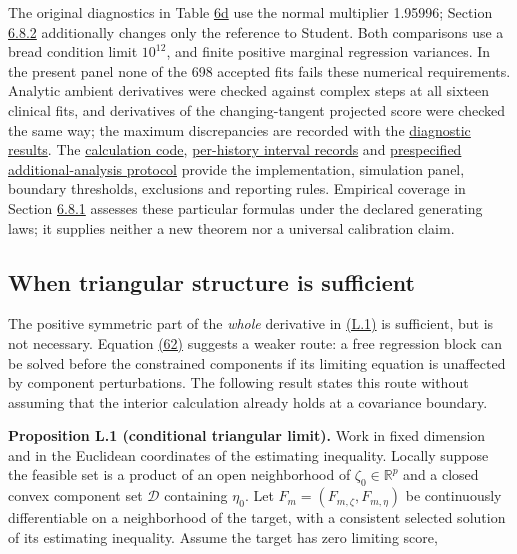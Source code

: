 \documentclass[11pt]{article}
\begin{document}
The original diagnostics in Table \hyperref[tab:6d]{6d} use the normal multiplier 1.95996; Section \hyperref[sec:6.8.2]{6.8.2} additionally changes only the reference to Student. Both comparisons use a bread condition limit \(10^{12}\), and finite positive marginal regression variances. In the present panel none of the 698 accepted fits fails these numerical requirements. Analytic ambient derivatives were checked against complex steps at all sixteen clinical fits, and derivatives of the changing-tangent projected score were checked the same way; the maximum discrepancies are recorded with the \href{../results/manuscript_v010/clinical_records.json}{diagnostic results}. The \href{../docs/reproducibility.md}{calculation code}, \href{../results/manuscript_v010/coverage_records.jsonl.gz}{per-history interval records} and \href{../docs/reproducibility.md}{prespecified additional-analysis protocol} provide the implementation, simulation panel, boundary thresholds, exclusions and reporting rules. Empirical coverage in Section \hyperref[sec:6.8.1]{6.8.1} assesses these particular formulas under the declared generating laws; it supplies neither a new theorem nor a universal calibration claim.

\subsection{When triangular structure is sufficient}\label{sec:L.3}

The positive symmetric part of the \emph{whole} derivative in \hyperref[eq:L.1]{(L.1)} is sufficient, but is not necessary. Equation \hyperref[eq:62]{(62)} suggests a weaker route: a free regression block can be solved before the constrained components if its limiting equation is unaffected by component perturbations. The following result states this route without assuming that the interior calculation already holds at a covariance boundary.

\label{res:Proposition-L.1}
\textbf{Proposition L.1 (conditional triangular limit).} Work in fixed dimension and in the Euclidean coordinates of the estimating inequality. Locally suppose the feasible set is a product of an open neighborhood of \(\zeta_0\in\mathbb R^p\) and a closed convex component set \(\mathcal D\) containing \(\eta_0\). Let \(F_m=(F_{m,\zeta},F_{m,\eta})\) be continuously differentiable on a neighborhood of the target, with a consistent selected solution of its estimating inequality. Assume the target has zero limiting score,
\end{document}
